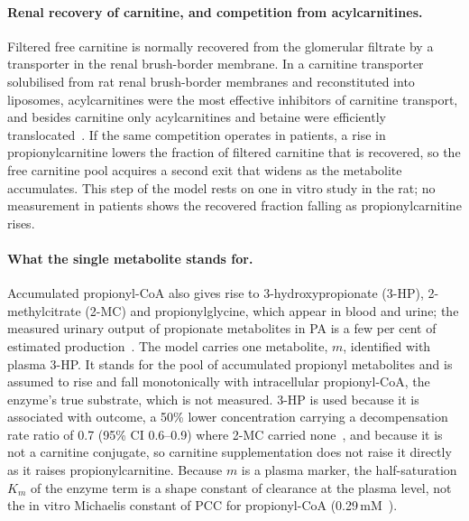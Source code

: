 \paragraph{Renal recovery of carnitine, and competition from acylcarnitines.} Filtered free
carnitine is normally recovered from the glomerular filtrate by a transporter in the renal
brush-border membrane. In a carnitine transporter solubilised from rat renal brush-border
membranes and reconstituted into liposomes, acylcarnitines were the most effective
inhibitors of carnitine transport, and besides carnitine only acylcarnitines and betaine
were efficiently translocated~\cite{octn2_renal_transport}. If the same competition
operates in patients, a rise in propionylcarnitine lowers the fraction of filtered carnitine
that is recovered, so the free carnitine pool acquires a second exit that widens as the
metabolite accumulates. This step of the model rests on one in vitro study in the rat; no
measurement in patients shows the recovered fraction falling as propionylcarnitine rises.

\paragraph{What the single metabolite stands for.} Accumulated propionyl-CoA also gives rise
to 3-hydroxypropionate (3-HP), 2-methylcitrate (2-MC) and propionylglycine, which appear in
blood and urine; the measured urinary output of propionate metabolites in PA is a few per
cent of estimated production~\cite{thompson1990fasting}. The model carries one metabolite,
$m$, identified with plasma 3-HP. It stands for the pool of accumulated propionyl
metabolites and is assumed to rise and fall monotonically with intracellular propionyl-CoA,
the enzyme's true substrate, which is not measured. 3-HP is used because it is associated
with outcome, a 50\% lower concentration carrying a decompensation rate ratio of 0.7 (95\%
CI 0.6--0.9) where 2-MC carried none~\cite{natural_history}, and because it is not a
carnitine conjugate, so carnitine supplementation does not raise it directly as it raises
propionylcarnitine. Because $m$ is a plasma marker, the half-saturation $K_m$ of
the enzyme term is a shape constant of clearance at the plasma level, not the in vitro
Michaelis constant of PCC for propionyl-CoA (0.29\,mM~\cite{pcc_liver_kinetics}).

